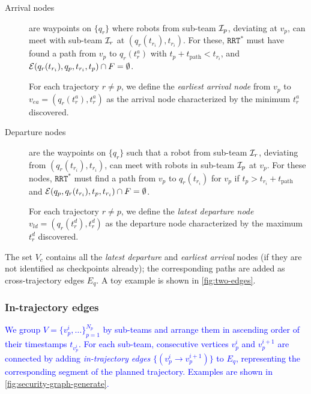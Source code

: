 \documentclass[10pt,twocolumn,twoside]{IEEEtran}
\newcommand{\rrtstar}{$\texttt{RRT}^\texttt{*}$}
\newcommand{\new}[1]{\textcolor{blue}{#1}}
\newcommand{\news}{\color{blue}}
\begin{document}
\begin{description}
\item[Arrival nodes] are waypoints on $\{q_r\}$ where robots from sub-team $\mathcal{I}_p$, deviating at $v_p$, can meet with sub-team $\mathcal{I}_r$ at $(q_r(t_{r_i}),t_{r_i})$. For these, \rrtstar{} must have found a path from $v_p$ to $q_{r}(t^{a}_r)$ with $t_{p}+t_{\textrm{path}}<t_{{r}_{i}}$, and $\mathcal{E}(q_{r}(t_{{r}_{i}}),q_{p},t_{{r}_{i}},t_{p}) \cap F = \emptyset$.

For each trajectory $r\neq p$, we define the \emph{earliest arrival node} from $v_p$ to $v_{ea} = (q_{r}(t^{a}_r),t^{a}_r)$ as the arrival node characterized by the minimum $t^{a}_r$ discovered. 

\item[Departure nodes] are the waypoints on $\{q_r\}$ such that a robot from sub-team $\mathcal{I}_r$, deviating from $(q_{r}(t_{{r}_{i}}),t_{{r}_{i}})$, can meet with robots in sub-team $\mathcal{I}_p$ at $v_{p}$. For these nodes, \rrtstar{} must find a path from $v_p$ to $q_{r}(t_{{r}_{i}})$ for $v_p$ if  $t_{p}>t_{{r}_{i}}+t_{\textrm{path}}$ and $\mathcal{E}(q_{p}, q_{r}(t_{{r}_{i}}),t_{p}, t_{{r}_{i}}) \cap F = \emptyset$. 

For each trajectory $r\neq p$, we define the \emph{latest departure node} $v_{ld}=(q_{r}(t^{d}_r),t^{d}_r)$ as the departure node characterized by the maximum $t^{d}_r$ discovered.
\end{description}
{\news The set $V_c$ contains all the \emph{latest departure} and \emph{earliest arrival} nodes (if they are not identified as checkpoints already); the corresponding paths are added as cross-trajectory edges $E_q$. A toy example is shown in \cref{fig:two-edges}.}

\subsubsection{In-trajectory edges}\label{sec:Graph-intro}
\new{We group $V =\{ v^i_p,\dots\}_{p=1}^{N_p}$ by sub-teams and arrange them in ascending order of their timestamps $t_{v^i_{p}}$. For each sub-team, consecutive vertices $v^i_{p}$ and $v^{i+1}_{p}$ are connected by adding \emph{in-trajectory edges} $\{(v^i_{p}\rightarrow v^{i+1}_{p})\}$ to $E_q$, representing the corresponding segment of the planned trajectory. Examples are shown in \cref{fig:security-graph-generate}. }
\end{document}

